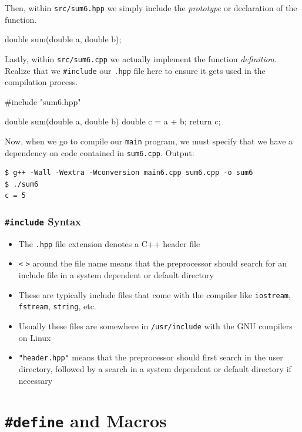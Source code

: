 \documentclass[12pt,letterpaper,twoside]{article}
\begin{document}
Then, within \texttt{src/sum6.hpp} we simply include the \emph{prototype} or 
declaration of the function.

\begin{cpp}
double sum(double a, double b);
\end{cpp}

Lastly, within \texttt{src/sum6.cpp} we actually implement the function \emph{definition}.
Realize that we \texttt{\#include} our \texttt{.hpp} file here to ensure it 
gets used in the compilation process.

\begin{cpp}
#include "sum6.hpp"

double sum(double a, double b) {
  double c = a + b;
  return c;
}
\end{cpp}

Now, when we go to compile our \texttt{main} program, we must specify that we have a 
dependency on code contained in \texttt{sum6.cpp}.
Output:

\begin{verbatim}
$ g++ -Wall -Wextra -Wconversion main6.cpp sum6.cpp -o sum6
$ ./sum6
c = 5
\end{verbatim}

\subsubsection{\texttt{\#include} Syntax}
\begin{itemize}
\item
  The \texttt{.hpp} file extension denotes a C++ header file
\item
  \texttt{\textless{}} \texttt{\textgreater{}} around the file name
  means that the preprocessor should search for an include file in a
  system dependent or default directory
\item
  These are typically include files that come with the compiler like
  \texttt{iostream}, \texttt{fstream}, \texttt{string}, etc.
\item
  Usually these files are somewhere in \texttt{/usr/include} with the
  GNU compilers on Linux
\item
  \texttt{"header.hpp"} means that the preprocessor should first search
  in the user directory, followed by a search in a system dependent or
  default directory if necessary
\end{itemize}

\section{\texttt{\#define} and Macros}
\end{document}
